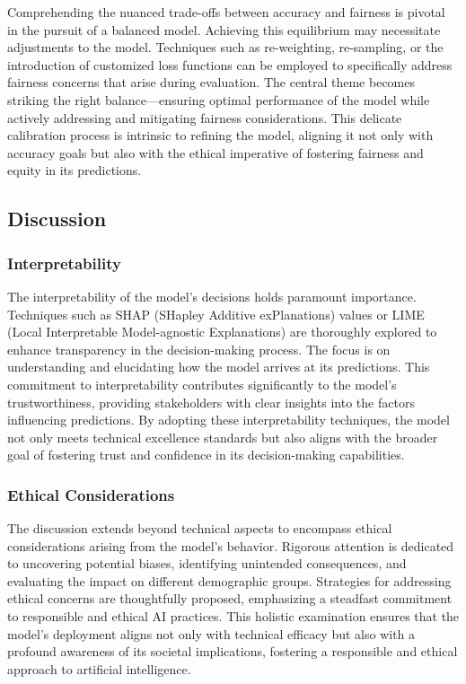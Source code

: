 Comprehending the nuanced trade-offs between accuracy and fairness is pivotal in the pursuit of a balanced model. Achieving this equilibrium may necessitate adjustments to the model. Techniques such as re-weighting, re-sampling, or the introduction of customized loss functions can be employed to specifically address fairness concerns that arise during evaluation. The central theme becomes striking the right balance—ensuring optimal performance of the model while actively addressing and mitigating fairness considerations. This delicate calibration process is intrinsic to refining the model, aligning it not only with accuracy goals but also with the ethical imperative of fostering fairness and equity in its predictions.

\subsection{Discussion}

\subsubsection{Interpretability}

The interpretability of the model's decisions holds paramount importance. Techniques such as SHAP (SHapley Additive exPlanations) values or LIME (Local Interpretable Model-agnostic Explanations) are thoroughly explored to enhance transparency in the decision-making process. The focus is on understanding and elucidating how the model arrives at its predictions. This commitment to interpretability contributes significantly to the model's trustworthiness, providing stakeholders with clear insights into the factors influencing predictions. By adopting these interpretability techniques, the model not only meets technical excellence standards but also aligns with the broader goal of fostering trust and confidence in its decision-making capabilities.

\subsubsection{Ethical Considerations}

The discussion extends beyond technical aspects to encompass ethical considerations arising from the model's behavior. Rigorous attention is dedicated to uncovering potential biases, identifying unintended consequences, and evaluating the impact on different demographic groups. Strategies for addressing ethical concerns are thoughtfully proposed, emphasizing a steadfast commitment to responsible and ethical AI practices. This holistic examination ensures that the model's deployment aligns not only with technical efficacy but also with a profound awareness of its societal implications, fostering a responsible and ethical approach to artificial intelligence.

